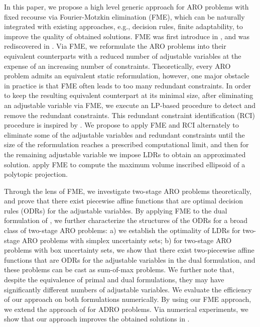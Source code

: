 \documentclass[fleqn,mnsc,blindrev]{informs4}
\begin{document}
	In this paper, we propose a high level generic approach for ARO problems with fixed recourse via Fourier-Motzkin elimination (FME), which can be naturally integrated with existing approaches, e.g., decision rules, finite adaptability, to improve the quality of obtained solutions. FME was first introduce in \cite{f26}, and was rediscovered in \cite{m36}. Via FME, we reformulate the ARO problems into their equivalent counterparts with  {a} reduced number of adjustable variables at the expense of an increasing number of constraints. Theoretically, every ARO problem admits an equivalent static reformulation, however, one major obstacle in practice is that FME often leads to too many redundant constraints. In order to keep the resulting equivalent counterpart at its minimal size, after eliminating an adjustable variable via FME, we execute an LP-based procedure to detect and remove  the redundant constraints. This redundant constraint identification (RCI) procedure is inspired by \cite{cmp89}. We propose to apply FME and RCI alternately to eliminate some of the adjustable variables and redundant constraints  {until} the size of the reformulation reaches a prescribed computational limit, and then for the remaining adjustable variable we impose LDRs to obtain an approximated solution. \cite{zd17b} apply FME to compute the maximum volume inscribed ellipsoid of a polytopic projection.
	
	Through the lens of FME, we investigate two-stage ARO problems theoretically, and prove that there exist piecewise affine functions that are optimal decision rules (ODRs) for the adjustable variables. By applying FME to the dual formulation of \cite{bd16}, we further characterize the structures of the ODRs for a broad class of two-stage ARO problems: a) we establish the optimality of LDRs for two-stage ARO problems with simplex uncertainty sets; b) for two-stage ARO problems with box uncertainty sets, we show that there exist two-piecewise affine functions that are ODRs for the adjustable variables in the dual formulation, and these problems can be  {cast} as sum-of-max problems. We further note that, despite the equivalence of primal and dual formulations, they may have significantly different  {numbers} of adjustable variables. We evaluate the efficiency of our approach on both  formulations numerically. By using our FME approach, we extend the approach of \cite{bsz17} for ADRO problems. Via numerical experiments,  we show that our approach improves the obtained solutions in \cite{bsz17}.
	
\end{document}
